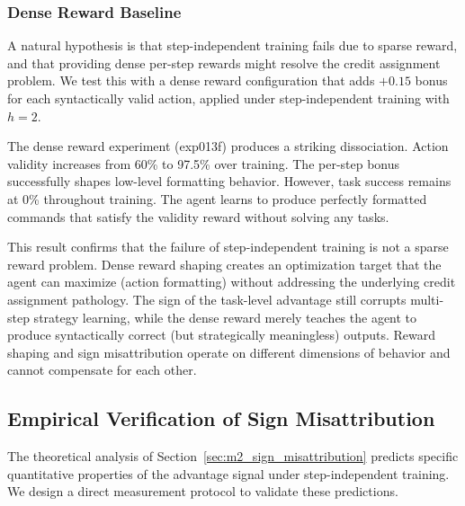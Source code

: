 \subsubsection{Dense Reward Baseline}
\label{sec:results_dense}

A natural hypothesis is that step-independent training fails due to sparse reward, and that providing dense per-step rewards might resolve the credit assignment problem. We test this with a dense reward configuration that adds $+0.15$ bonus for each syntactically valid action, applied under step-independent training with $h = 2$.

The dense reward experiment (exp013f) produces a striking dissociation. Action validity increases from 60\% to 97.5\% over training. The per-step bonus successfully shapes low-level formatting behavior. However, task success remains at 0\% throughout training. The agent learns to produce perfectly formatted commands that satisfy the validity reward without solving any tasks.

This result confirms that the failure of step-independent training is not a sparse reward problem. Dense reward shaping creates an optimization target that the agent can maximize (action formatting) without addressing the underlying credit assignment pathology. The sign of the task-level advantage still corrupts multi-step strategy learning, while the dense reward merely teaches the agent to produce syntactically correct (but strategically meaningless) outputs. Reward shaping and sign misattribution operate on different dimensions of behavior and cannot compensate for each other.

\subsection{Empirical Verification of Sign Misattribution}
\label{sec:sign_verification}

The theoretical analysis of Section~\ref{sec:m2_sign_misattribution} predicts specific quantitative properties of the advantage signal under step-independent training. We design a direct measurement protocol to validate these predictions.

